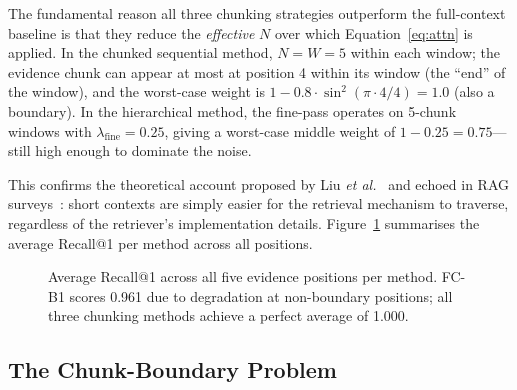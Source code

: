 \documentclass[sigconf,nonacm]{acmart}
\begin{document}
The fundamental reason all three chunking strategies outperform the full-context
baseline is that they reduce the \emph{effective} $N$ over which
Equation~\ref{eq:attn} is applied.
In the chunked sequential method, $N = W = 5$ within each window; the evidence
chunk can appear at most at position 4 within its window (the ``end'' of the
window), and the worst-case weight is $1 - 0.8 \cdot \sin^2(\pi \cdot 4/4) = 1.0$
(also a boundary).
In the hierarchical method, the fine-pass operates on 5-chunk windows with
$\lambda_\text{fine} = 0.25$, giving a worst-case middle weight of $1 - 0.25 = 0.75$—
still high enough to dominate the noise.

This confirms the theoretical account proposed by Liu \emph{et al.}~\cite{liu2023lost}
and echoed in RAG surveys~\cite{gao2023retrieval}: short contexts are simply
easier for the retrieval mechanism to traverse, regardless of the retriever's
implementation details.
Figure~\ref{fig:avgrecall} summarises the average Recall@1 per method across all positions.

\begin{figure}[t]
\centering
{}
\caption{Average Recall@1 across all five evidence positions per method.
  FC-B1 scores 0.961 due to degradation at non-boundary positions;
  all three chunking methods achieve a perfect average of 1.000.}
\label{fig:avgrecall}
\end{figure}

\subsection{The Chunk-Boundary Problem}
\end{document}
